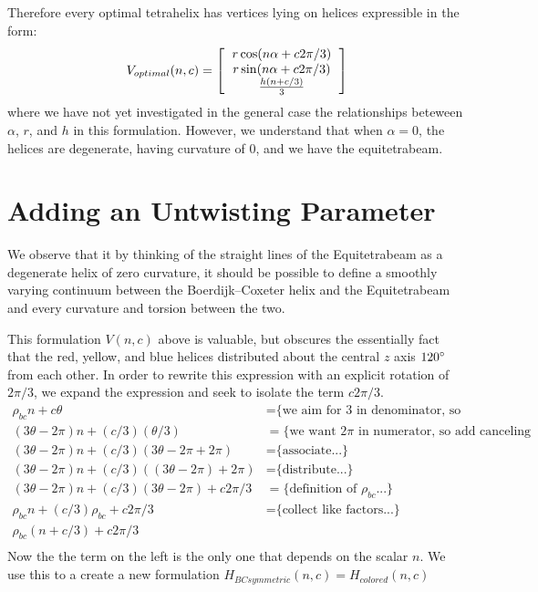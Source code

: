 \documentclass[11pt]{article}
\begin{document}
Therefore every optimal tetrahelix has vertices lying on helices expressible in the form:
\[
V_{optimal}(n,c) =
\left [
  \begin{tabular}{c}
   $ r \cos(n \alpha +  c 2 \pi /3)$\\
   $ r \sin(n \alpha +  c 2 \pi /3) $\\
   $ \frac{h(n +c / 3)}{3}   $
  \end{tabular}
\right ]
\]
where we have not yet investigated in the general case the relationships beteween $\alpha$, $r$, and $h$ in this formulation.
However, we understand that when $\alpha = 0$, the helices are degenerate, having curvature of $0$, and
we have the equitetrabeam.





\section{Adding an Untwisting Parameter}

We observe that it by thinking of the straight lines of the Equitetrabeam as a degenerate helix of zero curvature,
it should be possible to define a smoothly varying continuum between the Boerdijk--Coxeter helix and the Equitetrabeam and every
curvature and torsion between the two.

This formulation $V(n,c)$ above is valuable, but obscures the essentially fact that the red, yellow, and blue helices distributed
about the central $z$ axis $120\degree$ from each other.
In order to rewrite this expression with an explicit rotation of $2\pi/3$, we expand 
the expression and seek to isolate the term $c2\pi/3$.
\begin{align*}
  \rho_{bc} n + c \theta  &=   \text{\{we aim for 3 in denominator, so we split...\}} \\
    (3 \theta - 2 \pi)n + (c/3)  (\theta /3)  &=   \text{\{we want $2\pi$ in numerator, so add canceling terms...\}} \\
  (3 \theta - 2 \pi)n + (c/ 3) (3 \theta - 2 \pi  + 2 \pi) &=  \text{\{associate...\}} \\
  (3 \theta - 2 \pi)n + (c/ 3) ((3 \theta - 2 \pi)  + 2 \pi) &=  \text{\{distribute...\}} \\  
  (3 \theta - 2 \pi)n + (c / 3) (3 \theta - 2 \pi)  + c 2 \pi /3 &=  \text{\{definition of $\rho_{bc}$...\}} \\
  \rho_{bc} n + (c / 3) \rho_{bc}  + c 2 \pi /3 &=  \text{\{collect like factors...\}} \\  
  \rho_{bc} (n + c/3)  + c 2 \pi /3  \\
\end{align*}
Now the the term on the left is the only one that depends on the scalar $n$. We use this to a create
a new formulation $H_{BCsymmetric}(n,c) = H_{colored}(n,c)$
\end{document}

